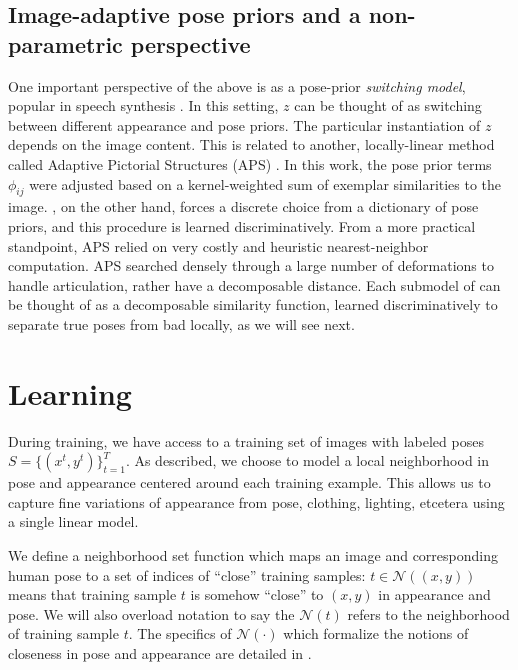 \subsection{Image-adaptive pose priors and a non-parametric perspective}
One important perspective of the above is as a pose-prior {\em switching 
model}, popular in speech synthesis \citep{rosti2003switching}.  In this 
setting, $z$ can be thought of as switching between different appearance and 
pose priors.  The particular instantiation of $z$ depends on the image content.  
This is related to another, locally-linear method called Adaptive Pictorial 
Structures (APS) \citet{sapp2010}.  In this work, the pose prior terms 
$\phi_{ij}$ were adjusted based on a kernel-weighted sum of exemplar 
similarities to the image.  \LLPS, on the other hand, forces a discrete choice 
from a dictionary of pose priors, and this procedure is learned 
discriminatively.  From a more practical standpoint, APS relied on very costly 
and heuristic nearest-neighbor computation.  APS searched densely through a 
large number of deformations to handle articulation, rather have a decomposable 
distance.  Each submodel of \LLPS can be thought of as a decomposable 
similarity function, learned discriminatively to separate true poses from bad 
locally, as we will see next.

\section{Learning}\label{sec:llps-learning}

During training, we have access to a training set of images with labeled poses 
$S = \{(x^{t},y^{t})\}_{t=1}^T$.  As described, we choose to model a local 
neighborhood in pose and appearance centered around each training example.  
This allows us to capture fine variations of appearance from pose, clothing, 
lighting, etcetera using a single linear model.

We define a neighborhood set function which maps an image and corresponding 
human pose to a set of indices of ``close'' training samples: $t \in 
\mathcal{N}((x,y))$ means that training sample $t$ is somehow ``close'' to 
$(x,y)$ in appearance and pose.  We will also overload notation to say the 
$\mathcal{N}(t)$ refers to the neighborhood of training sample $t$.  The 
specifics of $\mathcal{N}(\cdot)$ which formalize the notions of closeness in 
pose and appearance are detailed in .

